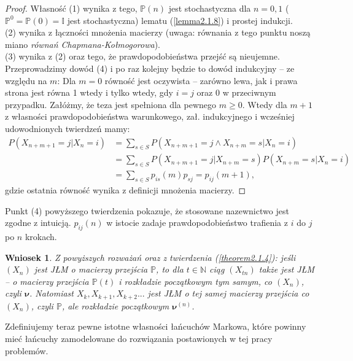 \documentclass[a4paper]{article}
\theoremstyle{defn}
\theoremstyle{theorem}
\theoremstyle{lemma}
\theoremstyle{cor}
\newtheorem{cor}[defn]{Wniosek}
\theoremstyle{fact}
\begin{document}
\begin{proof}
Własność (1) wynika z tego, $\mathbb{P}(n)$ jest stochastyczna dla $n= 0,1$ ($\mathbb{P}^0 = \mathbb{P}(0) = \mathbb{I}$ jest stochastyczna) lematu (\ref{lemma2.1.8}) i prostej indukcji.
\\(2) wynika z łączności mnożenia macierzy (uwaga: równania z tego punktu noszą miano \textit{równań Chapmana-Kołmogorowa}). \\
(3) wynika z (2) oraz tego, że prawdopodobieństwa przejść są nieujemne.\\
Przeprowadzimy dowód (4) i po raz kolejny będzie to dowód indukcyjny – ze względu na $m$:
Dla $m=0$ równość jest oczywista – zarówno lewa, jak i prawa strona jest równa 1 wtedy i tylko wtedy, gdy $i = j$ oraz 0 w przeciwnym przypadku. Załóżmy, że teza jest spełniona dla pewnego $m \geq 0$. Wtedy dla $m+1$ z własności prawdopodobieństwa warunkowego, zał. indukcyjnego i wcześniej udowodnionych twierdzeń mamy: \begin{align*}
    P(X_{n+m+1}=j|X_n = i) &= \sum\limits_{s \in S} P(X_{n+m+1}=j \land X_{n+m}=s |X_n = i) \\
    &= \sum\limits_{s \in S} P(X_{n+m+1}=j | X_{n+m}=s)P(X_{n+m}=s|X_n = i) \\
    &= \sum\limits_{s \in S} p_{is}(m)p_{sj} = p_{ij}(m+1),
\end{align*}
gdzie ostatnia równość wynika z definicji mnożenia macierzy.
\end{proof}
Punkt (4) powyższego twierdzenia pokazuje, że stosowane nazewnictwo jest zgodne z intuicją. $p_{ij}(n)$ w istocie zadaje prawdopodobieństwo trafienia z $i$ do $j$ po $n$ krokach.

\begin{cor}\label{cor2.1.14}
Z powyższych rozważań oraz z twierdzenia (\ref{theorem2.1.4}): jeśli $(X_n)$ jest JŁM o macierzy przejścia $\mathbb{P}$, to dla $t \in \mathbb{N}$ ciąg $(X_{tn})$ także jest JŁM – o macierzy przejścia $\mathbb{P}(t)$ i rozkładzie początkowym tym samym, co $(X_n)$, czyli $\boldsymbol{\nu}$. Natomiast $X_{k}, X_{k+1}, X_{k+2}...$ jest JŁM o tej samej macierzy przejścia co $(X_n)$, czyli $\mathbb{P}$, ale rozkładzie początkowym $\boldsymbol{\nu}^{(n)}$.
\end{cor}

Zdefiniujemy teraz pewne istotne własności łańcuchów Markowa, które powinny mieć łańcuchy zamodelowane do rozwiązania postawionych w tej pracy problemów. 
\end{document}

